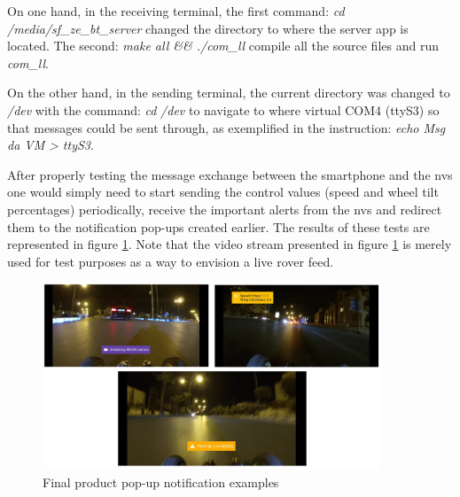 On one hand, in the receiving terminal, the first command:  \emph{cd} \emph{/media/sf\_ze\_bt\_server}
changed the directory to where the server app is located. The second:  \emph{make all \&\& ./com\_ll} compile all the source files and run \emph{com\_ll}.

On the other hand, in the sending terminal, the current directory was changed to \emph{/dev} with the command:  \emph{cd}  \emph{/dev}
to navigate to where virtual COM4 (ttyS3) so that messages could be sent through, as exemplified in the instruction:  \emph{echo Msg da VM}  \emph{> ttyS3}.

After properly testing the message exchange between the smartphone and the \gls{nvs} one would simply need to start sending the control values (speed and wheel tilt percentages) periodically, receive the important alerts from the \gls{nvs} and redirect them to the notification pop-ups created earlier. The results of these tests are represented in figure \ref{fig:alert-toast}. Note that the video stream presented in figure \ref{fig:alert-toast} is merely used for test purposes as a way to envision a live rover feed.
%
\begin{figure}[!ht]
\centering
\includegraphics[width=0.9\textwidth]{img/alert-popups.png}
\caption{\label{fig:alert-toast}Final product pop-up notification examples}
\end{figure}
%
